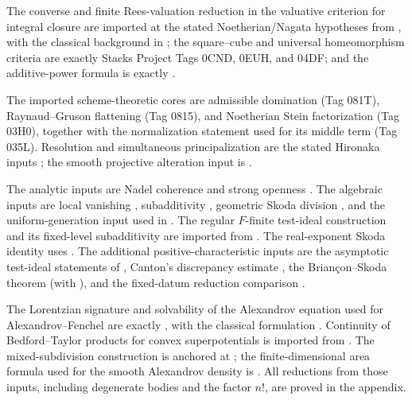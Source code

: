 \begin{description}[style=nextline,leftmargin=1.5em,labelindent=0pt]
\item[\Cref{app:valuation-algebra}.]
The converse and finite Rees-valuation reduction in the valuative criterion
for integral closure are imported at the stated Noetherian/Nagata
hypotheses from \cite[Theorems~6.8.3 and~10.2.2]{SwansonHuneke2006},
with the classical background in \cite[Chapter~VI]{ZariskiSamuelII}; the square--cube and universal
homeomorphism criteria are exactly Stacks Project Tags 0CND, 0EUH, and 04DF;
and the additive-power formula is exactly
\cite[Theorem~4.17, Proposition~4.2, and Corollary~4.3]{RobertsSingh}.

\item[\Cref{app:birational-geometry}.]
The imported scheme-theoretic cores are admissible domination (Tag 081T),
Raynaud--Gruson flattening (Tag 0815), and Noetherian Stein factorization
(Tag 03H0), together with the normalization statement used for its middle
term (Tag 035L).  Resolution and simultaneous principalization are the stated
Hironaka inputs \cite{Hironaka1964I,Hironaka1964II}; the smooth projective
alteration input is \cite[Theorem~4.1]{deJong1996}.

\item[\Cref{app:ideals}.]
The analytic inputs are Nadel coherence
\cite[Theorem~10.20]{Bou17} and strong openness
\cite[Theorem~1.1]{GZ15}.  The algebraic inputs are local vanishing
\cite[Theorem~9.4.1]{PAG2}, subadditivity
\cite[Theorem~2.3]{DEL00}, geometric Skoda division
\cite[Section~9.6]{PAG2}, and the uniform-generation input used in
\cite[Theorem~5.20]{BJ22}.  The regular \(F\)-finite test-ideal construction and its fixed-level
subadditivity are imported from \cite[Definition~2.2, Proposition~2.5, Lemma~2.7, Definition~2.9 and Proposition~2.11(4)]{BMS08}.
The real-exponent Skoda identity uses \cite[Proposition~2.25]{BMS08}.
The additional positive-characteristic inputs are the
asymptotic test-ideal statements of
\cite[Section~3 and Proposition~3.1]{MustataTest}, Canton's discrepancy
estimate \cite[Definition~3.3 and Proposition~4.1 in arXiv v3]{Canton}, the
Brian\c con--Skoda theorem
\cite[Theorem~6.9(iii)]{ST12} (with
\cite[Theorem~2.1]{HY03}), and the fixed-datum reduction comparison
\cite[Theorem~6.8]{HY03}.

\item[\Cref{app:convexity}.]
The Lorentzian signature and solvability of the Alexandrov equation used for
Alexandrov--Fenchel are exactly
\cite[Theorems~12.3 and~13.3]{Ber26Convex}, with the classical formulation
\cite[Theorem~7.3.1]{Sch14}.  Continuity of Bedford--Taylor products for
convex superpotentials is imported from
\cite[Theorem~4.2]{Ber26Convex}.  The mixed-subdivision construction is
anchored at \cite[Theorem~5.1.7]{Sch14}; the finite-dimensional area formula
used for the smooth Alexandrov density is
\cite[Theorem~3.8]{EvansGariepy}.  All reductions from those inputs,
including degenerate bodies and the factor \(n!\), are proved in the
appendix.


\end{description}

